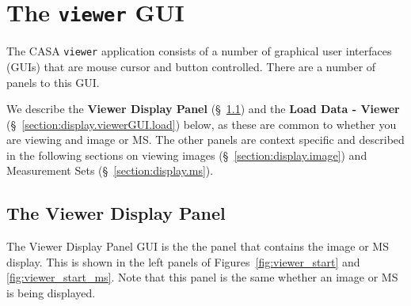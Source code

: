 \section{The {\tt viewer} GUI}
\label{section:display.viewerGUI}

The CASA {\tt viewer} application consists of a number of
graphical user interfaces (GUIs) that are mouse cursor and button
controlled.  There are a number of panels to this GUI. 

We describe the {\bf Viewer Display Panel} 
(\S~\ref{section:display.viewerGUI.displaypanel}) and the
{\bf Load Data - Viewer} 
(\S~\ref{section:display.viewerGUI.load})
below, as these are common to whether
you are viewing and image or MS.  The other panels are context
specific and described in the following sections on viewing
images (\S~\ref{section:display.image}) and 
Measurement Sets (\S~\ref{section:display.ms}).


\subsection{The Viewer Display Panel}
\label{section:display.viewerGUI.displaypanel}

 
The Viewer Display Panel GUI is the the panel that contains the
image or MS display.  This is shown in the left panels of 
Figures~\ref{fig:viewer_start} and \ref{fig:viewer_start_ms}.
Note that this panel is the same whether an image or MS is
being displayed.
 
